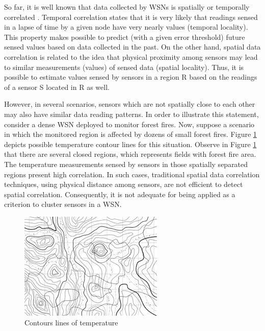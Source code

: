 \documentclass{acm_proc_article-sp}
\begin{document}
So far, it is well known that data collected by WSNs is spatially or temporally
correlated \cite{Chu2006, Villas2012, Yoon2005}. Temporal correlation states
that it is very likely that readings sensed in a lapse of time by a given node
have very nearly values (temporal locality). This property makes possible to
predict (with a given error threshold) future sensed values based on data
collected in the past. On the other hand, spatial data correlation is related to
the idea that physical proximity among sensors may lead to similar measurements
(values) of sensed data (spatial locality). Thus, it is possible to estimate
values sensed by sensors in a region R based on the readings of a sensor S
located in R as well.
\vspace*{-.3cm}

However, in several scenarios, sensors which are not spatially close to each
other may also have similar data reading patterns. In order to illustrate this
statement, consider a dense WSN deployed to monitor forest fires.
Now, suppose a scenario in which the monitored region is affected by dozens of
small forest fires. Figure \ref{fig:contour_lines} depicts possible temperature
contour lines for this situation. Observe in Figure \ref{fig:contour_lines} that
there are several closed regions, which represents fields with forest fire area.
The temperature measurements sensed by sensors in those spatially separated
regions present high correlation. In such cases, traditional spatial data
correlation techniques, using physical distance among sensors, are not efficient
to detect spatial correlation. Consequently, it is not adequate for being
applied as a criterion to cluster sensors in a WSN.

\begin{figure}[!htb]
\centering
	\includegraphics[scale=0.8]{I2.png}
    \caption{Contours lines of temperature}
    \label{fig:contour_lines}
\end{figure}
\vspace*{-.3cm}
\end{document}
